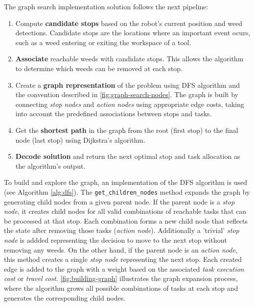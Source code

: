 The graph search implementation solution follows the next pipeline:
\begin{enumerate}
    \item Compute \textbf{candidate stops} based on the robot's current position and weed detections. Candidate stops are the locations where an important event ocurs, such as a weed entering or exiting the workspace of a tool.
    \item \textbf{Associate} reachable weeds with candidate stops. This allows the algorithm to determine which weeds can be removed at each stop.
    \item Create a \textbf{graph representation} of the problem using \ac{DFS} algorithm and the convention described in \autoref{fig:graph-search-nodes}. The graph is built by connecting \textit{stop nodes} and \textit{action nodes} using appropriate edge costs, taking into account the predefined associations between stops and tasks.
    \item Get the \textbf{shortest path} in the graph from the root (first stop) to the final node (last stop) using Dijkstra's algorithm.
    \item \textbf{Decode solution} and return the next optimal stop and task allocation as the algorithm's output.
\end{enumerate}


To build and explore the graph, an implementation of the \ac{DFS} algorithm is used (see Algorithm \ref{alg:dfs}). The \texttt{get\_children\_nodes} method expands the graph by generating child nodes from a given parent node. If the parent node is a \textit{stop node}, it creates child nodes for all valid combinations of reachable tasks that can be processed at that stop. Each combination forms a new child node that reflects the state after removing those tasks (\textit{action node}). Additionally a 'trivial' \textit{stop node} is addded representing the decision to move to the next stop without removing any weeds. On the other hand, if the parent node is an \textit{action node}, this method creates a single \textit{stop node} representing the next stop. Each created edge is added to the graph with a weight based on the associated \textit{task execution cost} or \textit{travel cost}. \autoref{fig:building-graph} illustrates the graph expansion process, where the algorithm grows all possible combinations of tasks at each stop and generates the corresponding child nodes. 

